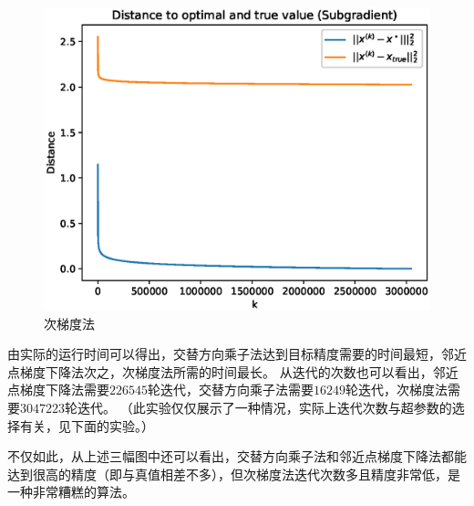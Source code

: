 \documentclass[logo,reportComp]{thesis}
\begin{document}
\begin{figure}[H]
\centering
\includegraphics[width=0.5\linewidth]{fig/subgrad.eps}
\caption{次梯度法}
\label{fig:subgrad}
\end{figure}

由实际的运行时间可以得出，交替方向乘子法达到目标精度需要的时间最短，邻近点梯度下降法次之，次梯度法所需的时间最长。
从迭代的次数也可以看出，邻近点梯度下降法需要$226545$轮迭代，交替方向乘子法需要$16249$轮迭代，次梯度法需要$3047223$轮迭代。
（此实验仅仅展示了一种情况，实际上迭代次数与超参数的选择有关，见下面的实验。）

不仅如此，从上述三幅图中还可以看出，交替方向乘子法和邻近点梯度下降法都能达到很高的精度（即与真值相差不多），但次梯度法迭代次数多且精度非常低，是一种非常糟糕的算法。
\end{document}
